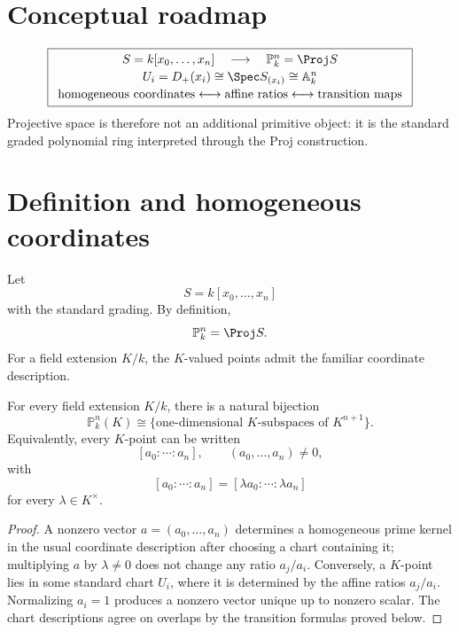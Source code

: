 \section*{Conceptual roadmap}
\[
\boxed{
\begin{array}{c}
S=k[x_0,\ldots,x_n]\quad\longrightarrow\quad\mathbb P^n_k=\Proj S\\[2pt]
U_i=D_+(x_i)\cong\Spec S_{(x_i)}\cong\mathbb A^n_k\\[2pt]
\text{homogeneous coordinates}\longleftrightarrow\text{affine ratios}\longleftrightarrow\text{transition maps}
\end{array}}
\]
Projective space is therefore not an additional primitive object: it is the standard graded polynomial ring interpreted through the Proj construction.



\section{Definition and homogeneous coordinates}
Let
\[
S=k[x_0,\ldots,x_n]
\]
with the standard grading.  By definition,
\[
\mathbb P^n_k=\Proj S.
\]
For a field extension \(K/k\), the \(K\)-valued points admit the familiar coordinate description.

\begin{theorem}\label{thm:vi36-homogeneous-coordinates}
For every field extension \(K/k\), there is a natural bijection
\[
\mathbb P^n_k(K)\cong\{\text{one-dimensional }K\text{-subspaces of }K^{n+1}\}.
\]
Equivalently, every \(K\)-point can be written
\[
[a_0:\cdots:a_n],\qquad (a_0,\ldots,a_n)\ne0,
\]
with
\[
[a_0:\cdots:a_n]=[\lambda a_0:\cdots:\lambda a_n]
\]
for every \(\lambda\in K^\times\).
\end{theorem}

\begin{proof}
A nonzero vector \(a=(a_0,\ldots,a_n)\) determines a homogeneous prime kernel in the usual coordinate description after choosing a chart containing it; multiplying \(a\) by \(\lambda\ne0\) does not change any ratio \(a_j/a_i\).  Conversely, a \(K\)-point lies in some standard chart \(U_i\), where it is determined by the affine ratios \(a_j/a_i\).  Normalizing \(a_i=1\) produces a nonzero vector unique up to nonzero scalar.  The chart descriptions agree on overlaps by the transition formulas proved below.
\end{proof}

